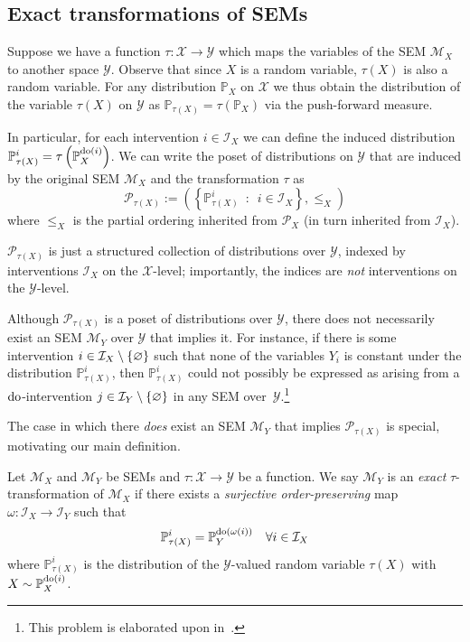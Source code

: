 \subsection{Exact transformations of SEMs}

Suppose we have a function ${\tau: \mathcal{X} \to \mathcal{Y}}$ which maps the variables of the SEM $\mathcal{M}_X$ to another space $\mathcal{Y}$.
Observe that since $X$ is a random variable, $\tau(X)$ is also a random variable.
For any distribution $\mathbb{P}_X$ on $\mathcal{X}$ we thus obtain the distribution of the variable $\tau(X)$ on $\mathcal{Y}$ as $\mathbb{P}_{\tau(X)} = \tau\left(\mathbb{P}_X\right)$ via the push-forward measure. 

In particular, for each intervention $i \in \mathcal{I}_X$ we can define the induced distribution $\mathbb{P}_{\tau(X)}^{i} = \tau\left(\mathbb{P}_X^{\operatorname{do}(i)}\right)$.
We can write the poset of distributions on $\mathcal{Y}$ that are induced by the original SEM $\mathcal{M}_X$ and the transformation $\tau$ as
\[\mathcal{P}_{\tau(X)} := \left( \left\{ \mathbb{P}_{\tau(X)}^{i} \enspace : \enspace i \in \mathcal{I}_X \right\}, \leq_X \right) \]
where $\leq_X$ is the partial ordering inherited from $\mathcal{P}_X$ (in turn inherited from $\mathcal{I}_X$).

$\mathcal{P}_{\tau(X)}$ is just a structured collection of distributions over $\mathcal{Y}$, indexed by interventions $\mathcal{I}_X$ on the $\mathcal{X}$-level; importantly, the indices are \emph{not} interventions on the $\mathcal{Y}$-level.



Although $\mathcal{P}_{\tau(X)}$ is a poset of distributions over $\mathcal{Y}$, there does not necessarily exist an SEM $\mathcal{M}_Y$ over $\mathcal{Y}$ that implies it.
For instance, if there is some intervention ${i \in \mathcal{I}_X \setminus \{ \varnothing \}}$ such that none of the variables $Y_i$ is constant under the distribution $\mathbb{P}_{\tau(X)}^{i}$, then $\mathbb{P}_{\tau(X)}^{i}$ could not possibly be expressed as arising from a $\operatorname{do}$-intervention $j\in \mathcal{I}_Y \setminus \{\varnothing\}$ in any SEM over~$\mathcal{Y}$.\footnote{This problem is elaborated upon in~\cite{eberhardt2016green}.}

The case in which there \emph{does} exist an SEM $\mathcal{M}_Y$ that implies $\mathcal{P}_{\tau(X)}$ is special, motivating our main definition.

\begin{definition}\label{def:exacttrafos}
Let $\mathcal{M}_X$ and $\mathcal{M}_Y$ be SEMs and $\tau: \mathcal{X} \to \mathcal{Y}$ be a function.
We say $\mathcal{M}_Y$ is an \emph{exact}  $\tau$-transformation of $\mathcal{M}_X$ if there exists a \emph{surjective order-preserving} map $\omega:\mathcal{I}_X\rightarrow \mathcal{I}_Y$ such that
\[ \mathbb{P}_{\tau(X)}^{i} = \mathbb{P}_Y^{\operatorname{do}(\omega(i))} \quad \forall i \in \mathcal{I}_X \]
where $\mathbb{P}_{\tau(X)}^{i}$ is the distribution of the $\mathcal{Y}$-valued random variable $\tau(X)$ with $X \sim \mathbb{P}_X^{\operatorname{do}(i)}$.
\end{definition}

